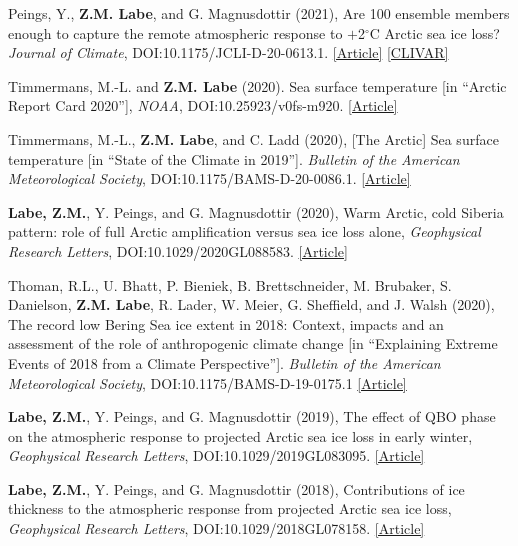 \documentclass[margin,line,palatino,courier,10pt]{res}
\begin{document}
\begin{resume}
\begin{etaremune}[leftmargin=0in,topsep=0in,parsep=0in]
\item Peings, Y., \textbf{Z.M. Labe}, and G. Magnusdottir (2021), Are 100 ensemble members enough to capture the remote atmospheric response to $+$2$^{\circ}$C Arctic sea ice loss? \textit{Journal of Climate}, DOI:10.1175/JCLI-D-20-0613.1. \href{https://journals.ametsoc.org/view/journals/clim/aop/JCLI-D-20-0613.1/JCLI-D-20-0613.1.xml}{[Article]} \href{https://usclivar.org/research-highlights/how-reproducible-response-2degc-arctic-sea-ice-loss-large-ensemble-simulations}{[CLIVAR]}
\item Timmermans, M.-L. and \textbf{Z.M. Labe} (2020). Sea surface temperature [in ``Arctic Report Card 2020''], \textit{NOAA}, DOI:10.25923/v0fs-m920. \href{https://arctic.noaa.gov/Report-Card/Report-Card-2020/ArtMID/7975/ArticleID/885/Sea-Surface-Temperature}{[Article]}
\item Timmermans, M.-L., \textbf{Z.M. Labe}, and C. Ladd (2020), [The Arctic] Sea surface temperature [in ``State of the Climate in 2019'']. \textit{Bulletin of the American Meteorological Society}, DOI:10.1175/BAMS-D-20-0086.1. \href{https://doi.org/10.1175/BAMS-D-20-0086.1}{[Article]}
\item \textbf{Labe, Z.M.}, Y. Peings, and G. Magnusdottir (2020), Warm Arctic, cold Siberia pattern: role of full Arctic amplification versus sea ice loss alone, \textit{Geophysical Research Letters}, DOI:10.1029/2020GL088583. \href{https://agupubs.onlinelibrary.wiley.com/doi/10.1029/2020GL088583}{[Article]}
\item Thoman, R.L., U. Bhatt, P. Bieniek, B. Brettschneider, M. Brubaker, S. Danielson, \textbf{Z.M. Labe}, R. Lader, W. Meier, G. Sheffield, and J. Walsh (2020), The record low Bering Sea ice extent in 2018: Context, impacts and an assessment of the role of anthropogenic climate change [in ``Explaining Extreme Events of 2018 from a Climate Perspective'']. \textit{Bulletin of the American Meteorological Society}, DOI:10.1175/BAMS-D-19-0175.1 \href{https://journals.ametsoc.org/doi/abs/10.1175/BAMS-D-19-0175.1}{[Article]}
\item \textbf{Labe, Z.M.}, Y. Peings, and G. Magnusdottir (2019), The effect of QBO phase on the atmospheric response to projected Arctic sea ice loss in early winter, \textit{Geophysical Research Letters}, DOI:10.1029/2019GL083095. \href{https://agupubs.onlinelibrary.wiley.com/doi/10.1029/2019GL083095}{[Article]}
\item \textbf{Labe, Z.M.}, Y. Peings, and G. Magnusdottir (2018), Contributions of ice thickness to the atmospheric response from projected Arctic sea ice loss, \textit{Geophysical Research Letters}, DOI:10.1029/2018GL078158. \href{https://agupubs.onlinelibrary.wiley.com/doi/10.1029/2018GL078158}{[Article]}

\end{etaremune}
\end{resume}
\end{document}

